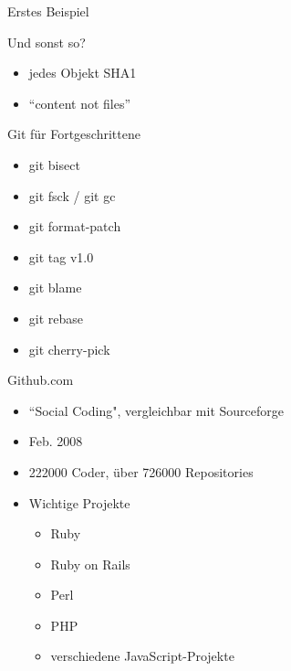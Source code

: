 \documentclass{beamer}
\begin{document}
\begin{frame}{Erstes Beispiel}

\end{frame}

\begin{frame}[<+->]{Und sonst so?}{}
  \begin{itemize}
    \item jedes Objekt SHA1
    \item ``content not files''
  \end{itemize}
\end{frame}

\begin{frame}[<+->]{Git für Fortgeschrittene}{}
  \begin{itemize}
    \item git bisect
    \item git fsck / git gc
    \item git format-patch
    \item git tag v1.0
    \item git blame
    \item git rebase
    \item git cherry-pick
  \end{itemize}
\end{frame}

\begin{frame}{Github.com}
\begin{itemize}
    \item ``Social Coding", vergleichbar mit Sourceforge
	\item Feb. 2008
	\item 222000 Coder, über 726000 Repositories
	\item Wichtige Projekte
	\begin{itemize}
	\item Ruby
	\item Ruby on Rails
	\item Perl
	\item PHP
	\item verschiedene JavaScript-Projekte
	\end{itemize}
  \end{itemize}
\end{frame}
\end{document}
